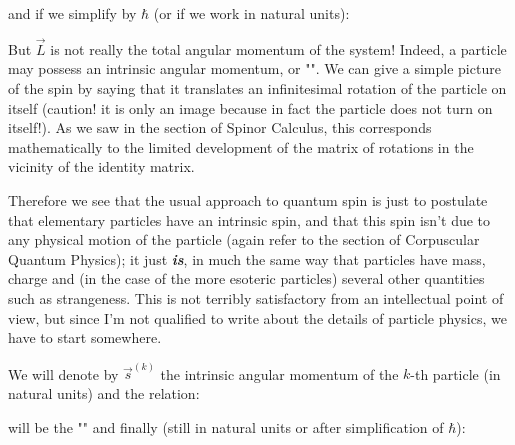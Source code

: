 	and if we simplify by $\hbar$ (or if we work in natural units):
	
	But $\vec{L}$ is not really the total angular momentum of the system! Indeed, a particle may possess an intrinsic angular momentum, or "". We can give a simple picture of the spin by saying that it translates an infinitesimal rotation of the particle on itself (caution! it is only an image because in fact the particle does not turn on itself!). As we saw in the section of Spinor Calculus, this corresponds mathematically to the limited development of the matrix of rotations in the vicinity of the identity matrix.
	
	Therefore we see that the usual approach to quantum spin is just to postulate that elementary particles have an intrinsic spin, and that this spin isn't due to any physical motion of the particle (again refer to the section of Corpuscular Quantum Physics); it just \textbf{\textit{is}}, in much the same way that particles have mass, charge and (in the case of the more esoteric particles) several other quantities such as strangeness. This is not terribly satisfactory from an intellectual point of view, but since I'm not qualified to write about the details of particle physics, we have to start somewhere.
	
	We will denote by $\vec{s}^{(k)}$ the intrinsic angular momentum of the $k$-th particle (in natural units) and the relation:
	
	will be the "\label{total spin}" and finally (still in natural units or after simplification of $\hbar$):
	
